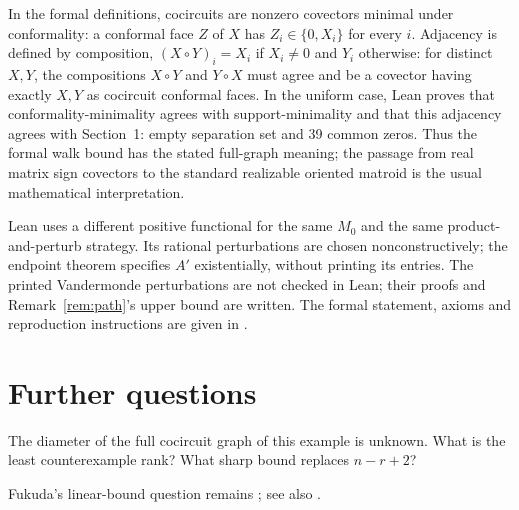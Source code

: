 \documentclass[11pt]{article}
\theoremstyle{remark}
\begin{document}
In the formal definitions, cocircuits are nonzero covectors minimal
under conformality: a conformal face $Z$ of $X$ has
$Z_i\in\{0,X_i\}$ for every $i$. Adjacency is defined by composition,
$(X\circ Y)_i=X_i$ if $X_i\ne0$ and $Y_i$ otherwise: for distinct
$X,Y$, the compositions $X\circ Y$ and $Y\circ X$ must agree and be a
covector having exactly $X,Y$ as cocircuit conformal faces. In the uniform
case, Lean proves that conformality-minimality agrees with support-minimality
and that this adjacency agrees with Section~1: empty separation set and
39 common zeros. Thus the formal walk bound has the stated full-graph
meaning; the passage from real matrix sign covectors to the standard
realizable oriented matroid is the usual mathematical interpretation.

Lean uses a different positive functional for the same $M_0$ and the
same product-and-perturb strategy. Its rational perturbations are chosen
nonconstructively; the endpoint theorem specifies $A'$ existentially,
without printing its entries.
The printed Vandermonde perturbations are not checked in Lean; their
proofs and Remark~\ref{rem:path}'s upper bound are written. The formal
statement, axioms and reproduction instructions are given in
\cite{supplement}.

\section{Further questions}

The diameter of the full cocircuit graph of this example is unknown. What is the least counterexample rank?
What sharp bound replaces $n-r+2$?

Fukuda's linear-bound question remains \cite[\S3.7.2, PDF p.~16]{survey};
see also \cite[Open Problem~5]{finschi}.
\end{document}

